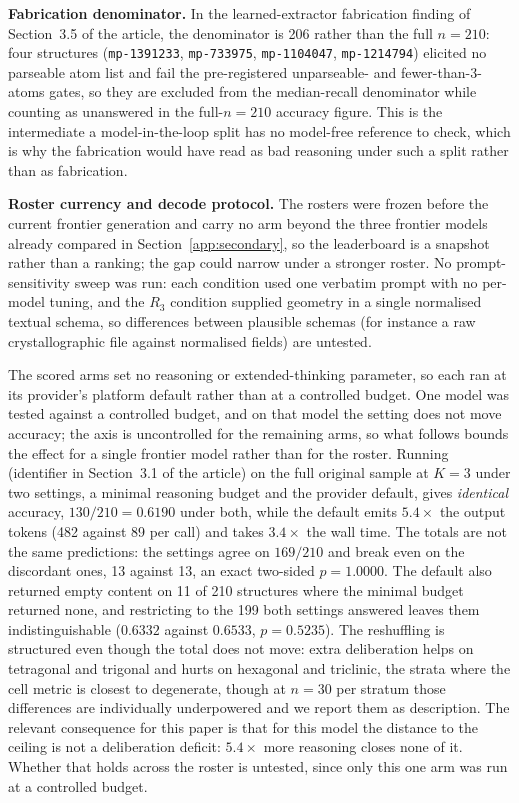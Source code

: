 \textbf{Fabrication denominator.} In the learned-extractor fabrication finding of
Section~3.5 of the article, the denominator is 206 rather than the full $n=210$: four
structures (\texttt{mp-1391233},
\texttt{mp-733975}, \texttt{mp-1104047}, \texttt{mp-1214794}) elicited no parseable atom list and fail the
pre-registered unparseable- and fewer-than-3-atoms gates, so they are excluded from the median-recall
denominator while counting as unanswered in the full-$n{=}210$ accuracy figure. This is the intermediate a
model-in-the-loop split has no model-free reference to check, which is why the fabrication would have read
as bad reasoning under such a split rather than as fabrication.

\textbf{Roster currency and decode protocol.} The rosters were frozen before the current frontier
generation and carry no arm beyond the three frontier models already compared in
Section~\ref{app:secondary}, so the leaderboard is a snapshot rather than a ranking; the gap could narrow
under a stronger roster. No prompt-sensitivity sweep was run: each condition used one verbatim prompt with no
per-model tuning, and the $R_3$ condition supplied geometry in a single normalised textual schema, so
differences between plausible schemas (for instance a raw crystallographic file against normalised fields)
are untested.

The scored arms set no reasoning or extended-thinking parameter, so each ran at its provider's platform
default rather than at a controlled budget. One model was tested against a controlled budget, and on that
model the setting does not move accuracy; the axis is uncontrolled for the remaining arms, so what follows
bounds the effect for a single frontier model rather than for the roster. Running \rlBudget{} (identifier
in Section~3.1 of the article) on
the full original sample at $K{=}3$ under two settings,
a minimal reasoning budget and the provider default, gives \emph{identical} accuracy, $130/210 = 0.6190$
under both, while the default emits $5.4\times$ the output tokens (482 against 89 per call) and takes
$3.4\times$ the wall time. The totals are not the same predictions: the settings agree on $169/210$ and
break even on the discordant ones, 13 against 13, an exact two-sided $p = 1.0000$. The default also
returned empty content on 11 of 210 structures where the minimal budget returned none, and restricting to
the 199 both settings answered leaves them indistinguishable ($0.6332$ against $0.6533$, $p = 0.5235$).
The reshuffling is structured even though the total does not move: extra deliberation helps on tetragonal
and trigonal and hurts on hexagonal and triclinic, the strata where the cell metric is closest to
degenerate, though at $n=30$ per stratum those differences are individually underpowered and we report
them as description. The relevant consequence for this paper is that for this model the distance to the
ceiling is not a deliberation deficit: $5.4\times$ more reasoning closes none of it. Whether that holds
across the roster is untested, since only this one arm was run at a controlled budget.

